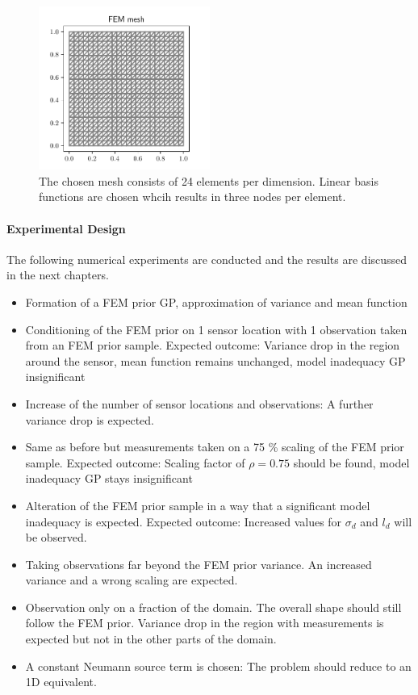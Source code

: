 \documentclass[%
  a4paper,oneside,%
  11pt,%
  smallchapters,
  style=printdev,
  extramargin,
  green,%
  rgb, <cmyk>
  ]{tubsbook}
\begin{document}
\begin{figure}[!ht]
\includegraphics[width=0.5\textwidth]{pics/mesh.pdf}
\centering
\caption{The chosen mesh consists of 24 elements per dimension. Linear basis functions are chosen whcih results in three nodes per element.}
\label{fig:meshFEM}
\end{figure}


\paragraph{Experimental Design}
The following numerical experiments are conducted and the results are discussed in the next chapters.

\begin{itemize}
  \item Formation of a FEM prior GP, approximation of variance and mean function
  \item Conditioning of the FEM prior on 1 sensor location with 1 observation taken from an FEM prior sample. Expected outcome: Variance drop in the region around the sensor, mean function remains unchanged, model inadequacy GP insignificant
  \item Increase of the number of sensor locations and observations: A further variance drop is expected.
  \item Same as before but measurements taken on a 75 \% scaling of the FEM prior sample. Expected outcome: Scaling factor of $\rho = 0.75$ should be found, model inadequacy GP stays insignificant
  \item Alteration of the FEM prior sample in a way that a significant model inadequacy is expected. Expected outcome: Increased values for $\sigma_d$ and $l_d$ will be observed.
  \item Taking observations far beyond the FEM prior variance. An increased variance and a wrong scaling are expected.
  \item Observation only on a fraction of the domain. The overall shape should still follow the FEM prior. Variance drop in the region with measurements is expected but not in the other parts of the domain.
  \item A constant Neumann source term is chosen: The problem should reduce to an 1D equivalent.

\end{itemize}
\end{document}

